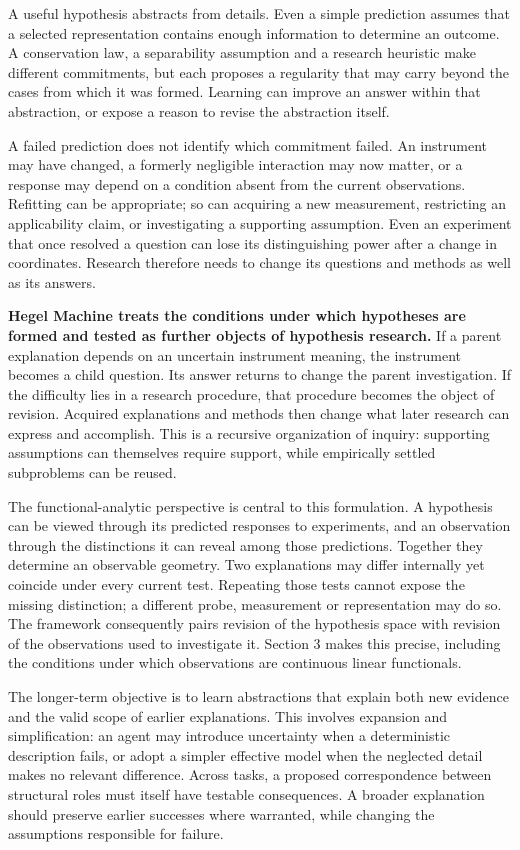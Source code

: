 \documentclass[twoside,11pt]{article}
\begin{document}
A useful hypothesis abstracts from details. Even a simple prediction assumes that a selected representation contains enough information to determine an outcome. A conservation law, a separability assumption and a research heuristic make different commitments, but each proposes a regularity that may carry beyond the cases from which it was formed. Learning can improve an answer within that abstraction, or expose a reason to revise the abstraction itself.


A failed prediction does not identify which commitment failed. An instrument may have changed, a formerly negligible interaction may now matter, or a response may depend on a condition absent from the current observations. Refitting can be appropriate; so can acquiring a new measurement, restricting an applicability claim, or investigating a supporting assumption. Even an experiment that once resolved a question can lose its distinguishing power after a change in coordinates. Research therefore needs to change its questions and methods as well as its answers.


\textbf{Hegel Machine treats the conditions under which hypotheses are formed and tested as further objects of hypothesis research.} If a parent explanation depends on an uncertain instrument meaning, the instrument becomes a child question. Its answer returns to change the parent investigation. If the difficulty lies in a research procedure, that procedure becomes the object of revision. Acquired explanations and methods then change what later research can express and accomplish. This is a recursive organization of inquiry: supporting assumptions can themselves require support, while empirically settled subproblems can be reused.


The functional-analytic perspective is central to this formulation. A hypothesis can be viewed through its predicted responses to experiments, and an observation through the distinctions it can reveal among those predictions. Together they determine an observable geometry. Two explanations may differ internally yet coincide under every current test. Repeating those tests cannot expose the missing distinction; a different probe, measurement or representation may do so. The framework consequently pairs revision of the hypothesis space with revision of the observations used to investigate it. Section 3 makes this precise, including the conditions under which observations are continuous linear functionals.


The longer-term objective is to learn abstractions that explain both new evidence and the valid scope of earlier explanations. This involves expansion and simplification: an agent may introduce uncertainty when a deterministic description fails, or adopt a simpler effective model when the neglected detail makes no relevant difference. Across tasks, a proposed correspondence between structural roles must itself have testable consequences. A broader explanation should preserve earlier successes where warranted, while changing the assumptions responsible for failure.
\end{document}
